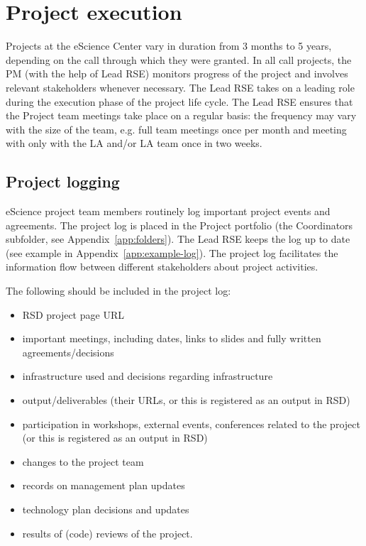 \section{Project execution}
Projects at the eScience Center vary in duration from 3 months to 5 years, depending on the call through which they were
granted. In all call projects, the PM (with the help of Lead RSE) monitors progress of the project and involves
relevant stakeholders whenever necessary. The Lead RSE takes on a leading role during the execution phase of the
project life cycle. The Lead RSE ensures that the Project team meetings take place on a regular basis: the frequency
may vary with the size of the team, e.g. full team meetings once per month and meeting with only with the LA and/or LA
team once in two weeks.

\subsection{Project logging}
\label{sec:exec:log}
eScience project team members routinely log important project events and agreements. The project log is placed in the
Project portfolio (the Coordinators subfolder, see Appendix~\ref{app:folders}). The Lead RSE keeps the log up to
date (see example in Appendix~\ref{app:example-log}). The project log facilitates the information flow between
different stakeholders about project activities.

The following should be included in the project log:
\begin{itemize}
\item RSD project page URL
\item important meetings, including dates, links to slides and fully written agreements/decisions
\item infrastructure used and decisions regarding infrastructure
\item output/deliverables (their URLs, or this is registered as an output in RSD)
\item participation in workshops, external events, conferences related to the project (or this is registered as an output in
RSD)
\item changes to the project team
\item records on management plan updates
\item technology plan decisions and updates
\item results of (code) reviews of the project.
\end{itemize}

